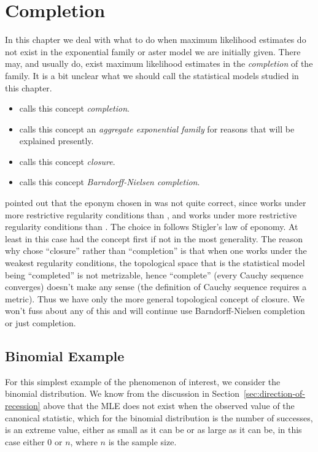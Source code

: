 
\chapter{Completion} \label{chap:completion}

In this chapter we deal with what to do when maximum likelihood estimates
do not exist in the exponential family or aster model we are initially given.
There may, and usually do, exist maximum likelihood estimates in the
\emph{completion} of the family.  It is a bit unclear what we should call
the statistical models studied in this chapter.
\begin{itemize}
\item \citet[Sections~9.3 and~9.4]{barndorff-nielsen} calls this concept
    \emph{completion}.
\item \citet[Chapter~6]{brown} calls this concept
    an \emph{aggregate exponential family} for reasons that will be explained
    presently.
\item \citet[Chapters~2 and~4]{geyer-thesis} calls this concept
    \emph{closure}.
\item \citet{geyer-gdor} calls this concept
    \emph{Barndorff-Nielsen completion}.
\end{itemize}
\citeauthor[personal communication]{brown} pointed out that the eponym chosen
in \citet{geyer-gdor} was not quite correct, since \citet{barndorff-nielsen}
works under more restrictive regularity conditions than \citet{brown}, and
\citet{brown} works under more restrictive regularity conditions than
\citet{geyer-thesis}.  The choice in \citet{geyer-gdor} follows
Stigler's law of eponomy.  At least in this case \citeauthor{barndorff-nielsen}
had the concept first if not in the most generality.
The reason why \citet{geyer-thesis} chose ``closure'' rather than ``completion''
is that when one works under the weakest regularity conditions, the topological
space that is the statistical model being ``completed'' is not metrizable,
hence ``complete'' (every Cauchy sequence converges) doesn't make any sense
(the definition of Cauchy sequence requires a metric).  Thus we have only
the more general topological concept of closure.
We won't fuss about any of this and will continue use Barndorff-Nielsen
completion or just completion.

\section{Binomial Example}

For this simplest example of the phenomenon of interest, we consider the
binomial distribution.  We know from the discussion
in Section~\ref{sec:direction-of-recession} above that the MLE does not exist
when the observed value of the canonical statistic, which for the binomial
distribution is the number of successes, is an extreme value, either as small
as it can be or as large as it can be, in this case either 0 or $n$, where
$n$ is the sample size.

